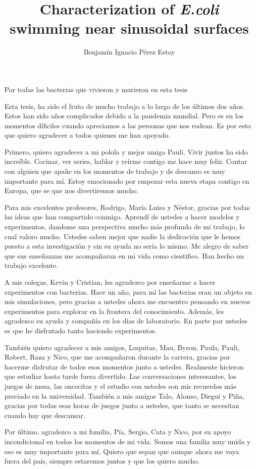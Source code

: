 \documentclass{umemoria}
\author{Benjamín Ignacio Pérez Estay}
\title{Characterization of \textit{E.coli} swimming near sinusoidal surfaces }
\begin{document}
\sloppy
\frontmatter
\maketitle




\begin{dedicatoria}
Por todas las bacterias que vivieron y murieron en esta tesis
\end{dedicatoria}

\begin{thanks}
Esta tesis, ha sido el fruto de mucho trabajo a lo largo de los últimos dos años. Estos han sido años complicados debido a la pandemia mundial. Pero es en los momentos díficiles cuando apreciamos a las personas que nos rodean. Es por esto que quiero agradecer a todos quienes me han apoyado.

Primero, quiero agradecer a mi polola y mejor amiga Pauli. Vivir juntos ha sido increíble. Cocinar, ver series, hablar y reírme contigo me hace muy feliz. Contar con alguien que apañe en los momentos de trabajo y de descanso es muy importante para mí. Estoy emocionado por empezar esta nueva etapa contigo en Europa, que se que nos divertiremos mucho. 

Para mis excelentes profesores, Rodrigo, María Luisa y Néstor, gracias por todas las ideas que han compartido conmigo. Aprendí de ustedes a hacer modelos y experimentos, dandome una perspectiva mucho más profunda de mi trabajo, lo cual valoro mucho. Ustedes saben mejor que nadie la dedicación que le hemos puesto a esta investigación y sin su ayuda no sería lo mismo. Me alegro de saber que sus enseñanzas me acompañaran en mi vida como cientifico. Han hecho un trabajo excelente.

A mis colegas, Kevin y Cristian, les agradezco por enseñarme a hacer experimentos con bacterias. Hace un año, para mí las bacterias eran un objeto en mis simulaciones, pero gracias a ustedes ahora me encuentro pensando en nuevos experimentos para explorar en la frontera del conocimiento. Además, les agradezco su ayuda y compañía en los días de laboratorio. En parte por ustedes es que he disfrutado tanto haciendo experimentos.

También quiero agradecer a mis amigos, Luquitas, Mau, Byron, Paula, Pauli, Robert, Raza y Nico, que me acompañaron durante la carrera, gracias por hacerme disfrutar de todos esos momentos junto a ustedes. Realmente hicieron que estudiar hasta tarde fuera divertido. Las conversaciones interesantes, los juegos de mesa, las oncecitas y el estudio con ustedes son mis recuerdos más preciado en la universidad. También a mis amigos Talo, Alonso, Diegui y Piña, gracias por todas esas horas de juegos junto a ustedes, que tanto se necesitan cuando hay que descansar.

Por último, agradezco a mi familia, Pía, Sergio, Cata y Nico, por su apoyo incondicional en todos los momentos de mi vida. Somos una familia muy unida y eso es muy importante para mí. Quiero que sepan que aunque ahora me vaya fuera del país, siempre estaremos juntos y que los quiero mucho.

\end{thanks}
\end{document}
